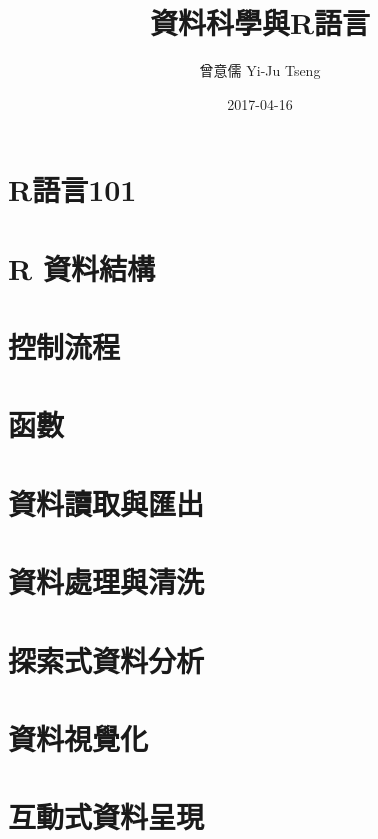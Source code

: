 \documentclass[]{book}
\title{資料科學與R語言}
\author{曾意儒 Yi-Ju Tseng}
\date{2017-04-16}
\begin{document}
\maketitle

{
\setcounter{tocdepth}{1}
\tableofcontents
}
\chapter*{}\label{preface}

\chapter{R語言101}\label{intro}

\chapter{R 資料結構}\label{RDataStructure}

\chapter{控制流程}\label{controlstructure}

\chapter{函數}\label{function}

\chapter{資料讀取與匯出}\label{io}

\chapter{資料處理與清洗}\label{manipulation}

\chapter{探索式資料分析}\label{eda}

\chapter{資料視覺化}\label{vis}

\chapter{互動式資料呈現}\label{InteractiveGraphics}
\end{document}
